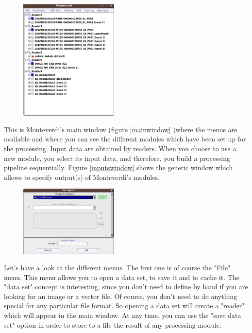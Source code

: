 \begin{figure}
   \center
   \includegraphics[width=0.44\textwidth]{../Art/MonteverdiImages/monteverdi_mainwindow.png}
   \label{fig:mainwindow}
\end{figure}

This is Monteverdi's main window (figure \ref{mainwindow} )where the menus are available and where you can see the different 
modules which have been 
set up for the processing. Input data are obtained by readers. When you choose to use a new module, you select its input data,
 and therefore, you build a processing pipeline sequentially. 
Figure \ref{inputswindow} shows the generic window which allows to specify output(s) of Monteverdi's modules. 
 
\begin{figure}
   \center
   \includegraphics[width=0.44\textwidth]{../Art/MonteverdiImages/monteverdi_inputs_window.png}
   \label{fig:inputswindow}
\end{figure}

Let's have a look at the different menus. The first one is of
 course the "File" menu. This menu allows you to open a data set, to save it and to cache it. The "data set" concept is
 interesting, since you don't need to define by hand if you are looking for an image or a vector file. Of course, 
you don't need to do anything special for any particular file format. So opening a data set will create a "reader" 
which will appear in the main window. At any time, you can use the "save data set" option in order to store to a 
file the result of any processing module.




